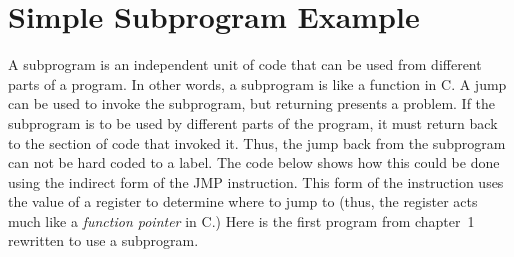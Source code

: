 \section{Simple Subprogram Example}

A subprogram is an independent unit of code that can be used from different
parts of a program. In other words, a subprogram is like a function in C. A
jump can be used to invoke the subprogram, but returning presents a problem.
If the subprogram is to be used by different parts of the program, it must
return back to the section of code that invoked it. Thus, the jump back from
the subprogram can not be hard coded to a label. The code below shows how this
could be done using the indirect form of the {\code JMP} instruction. This 
form of the instruction uses the value of a register to determine where to
jump to (thus, the register acts much like a \emph{function pointer} in C.)
Here is the first program from chapter~1 rewritten to use a subprogram.
